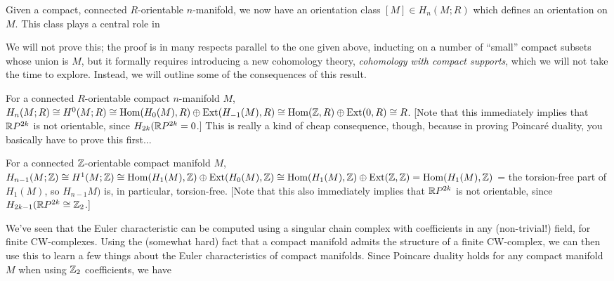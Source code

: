 \vfill
\eject

Given a compact, connected $R$-orientable $n$-manifold, we now have an orientation class $[M]\in H_n(M;R)$ which defines
an orientation on $M$. This class plays a central role in 

\ssk


\ssk

We will not prove this; the proof is in many respects parallel to the one given above, inducting on a
number of ``small'' compact subsets whose union is $M$, but it formally requires introducing a new 
cohomology theory, {\it cohomology with compact supports}, which we will not take the time to explore.
Instead, we will outline some of the consequences of this result.

\msk

For a connected $R$-orientable compact $n$-manifold $M$, 
$H_n(M;R)\cong H^0(M;R)\cong\text{Hom}(H_0(M),R)\oplus\text{Ext}(H_{-1}(M),R)\cong
\text{Hom}({\Bbb Z},R)\oplus\text{Ext}(0,R)\cong R$.
[Note that this
immediately implies that ${\Bbb R} P^{2k}$ is not orientable, since $H_{2k}({\Bbb R} P^{2k} = 0$.]
This is really a kind of cheap consequence, though, because in proving Poincar\'e duality, 
you basically have to prove this first...

\ssk

For a connected ${\Bbb Z}$-orientable compact manifold $M$,
$H_{n-1}(M;{\Bbb Z})\cong H^1(M;{\Bbb Z})\cong \text{Hom}(H_1(M),{\Bbb Z})\oplus \text{Ext}(H_0(M),{\Bbb Z})
\cong \text{Hom}(H_1(M),{\Bbb Z})\oplus \text{Ext}({\Bbb Z},{\Bbb Z})=\text{Hom}(H_1(M),{\Bbb Z})$ = the torsion-free
part of $H_1(M)$, so $H_{n-1}M)$ is, in particular, torsion-free. [Note that this also
immediately implies that ${\Bbb R} P^{2k}$ is not orientable, since $H_{2k-1}({\Bbb R} P^{2k}\cong {\Bbb Z}_2$.]

\vfill
\eject

We've seen that the Euler characteristic can be computed using a singular chain complex with coefficients
in any (non-trivial!) field, for finite CW-complexes. Using the (somewhat hard) fact that a compact manifold
admits the structure of a finite CW-complex, we can then use this to learn a few things about the Euler 
characteristics of compact manifolds. Since Poincare duality holds for any compact manifold $M$ when using
${\Bbb Z}_2$ coefficients, we have

\ssk

